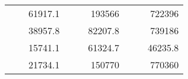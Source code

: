 \begin{table}[H]
\begin{tabular}{|ccrccrccc}
\rowcolor[HTML]{DDFDFF} 
\multicolumn{1}{|c|}{\cellcolor[HTML]{FFFFC7}}                                & \multicolumn{1}{c|}{\cellcolor[HTML]{DDFDFF}}                      & \multicolumn{1}{r|}{\cellcolor[HTML]{DAE8FC}61917.1}   & \multicolumn{1}{c|}{\cellcolor[HTML]{FFFFC7}}                                & \multicolumn{1}{c|}{\cellcolor[HTML]{DDFDFF}}                       & \multicolumn{1}{r|}{\cellcolor[HTML]{DDFDFF}193566}    & \multicolumn{1}{c|}{\cellcolor[HTML]{FFFFC7}}                                & \multicolumn{1}{c|}{\cellcolor[HTML]{DDFDFF}}                      & \multicolumn{1}{r|}{\cellcolor[HTML]{DDFDFF}722396}    \\ \cline{3-3} \cline{6-6} \cline{9-9} 
\multicolumn{1}{|c|}{\cellcolor[HTML]{FFFFC7}}                                & \multicolumn{1}{c|}{\cellcolor[HTML]{DDFDFF}}                      & \multicolumn{1}{r|}{\cellcolor[HTML]{DDFDFF}38957.8}   & \multicolumn{1}{c|}{\cellcolor[HTML]{FFFFC7}}                                & \multicolumn{1}{c|}{\cellcolor[HTML]{DDFDFF}}                       & \multicolumn{1}{r|}{\cellcolor[HTML]{DAE8FC}82207.8}   & \multicolumn{1}{c|}{\cellcolor[HTML]{FFFFC7}}                                & \multicolumn{1}{c|}{\cellcolor[HTML]{DDFDFF}}                      & \multicolumn{1}{r|}{\cellcolor[HTML]{DAE8FC}739186}    \\ \cline{3-3} \cline{6-6} \cline{9-9} 
\rowcolor[HTML]{DDFDFF} 
\multicolumn{1}{|c|}{\cellcolor[HTML]{FFFFC7}}                                & \multicolumn{1}{c|}{\cellcolor[HTML]{DDFDFF}}                      & \multicolumn{1}{r|}{\cellcolor[HTML]{DAE8FC}15741.1}   & \multicolumn{1}{c|}{\cellcolor[HTML]{FFFFC7}}                                & \multicolumn{1}{c|}{\cellcolor[HTML]{DDFDFF}}                       & \multicolumn{1}{r|}{\cellcolor[HTML]{DDFDFF}61324.7}   & \multicolumn{1}{c|}{\cellcolor[HTML]{FFFFC7}}                                & \multicolumn{1}{c|}{\cellcolor[HTML]{DDFDFF}}                      & \multicolumn{1}{r|}{\cellcolor[HTML]{DDFDFF}46235.8}   \\ \cline{3-3} \cline{6-6} \cline{9-9} 
\multicolumn{1}{|c|}{\cellcolor[HTML]{FFFFC7}}                                & \multicolumn{1}{c|}{\cellcolor[HTML]{DDFDFF}}                      & \multicolumn{1}{r|}{\cellcolor[HTML]{DDFDFF}21734.1}   & \multicolumn{1}{c|}{\cellcolor[HTML]{FFFFC7}}                                & \multicolumn{1}{c|}{\cellcolor[HTML]{DDFDFF}}                       & \multicolumn{1}{r|}{\cellcolor[HTML]{DAE8FC}150770}    & \multicolumn{1}{c|}{\cellcolor[HTML]{FFFFC7}}                                & \multicolumn{1}{c|}{\cellcolor[HTML]{DDFDFF}}                      & \multicolumn{1}{r|}{\cellcolor[HTML]{DAE8FC}770360}    \\ \cline{3-3} \cline{6-6} \cline{9-9} 

\end{tabular}
\end{table}
